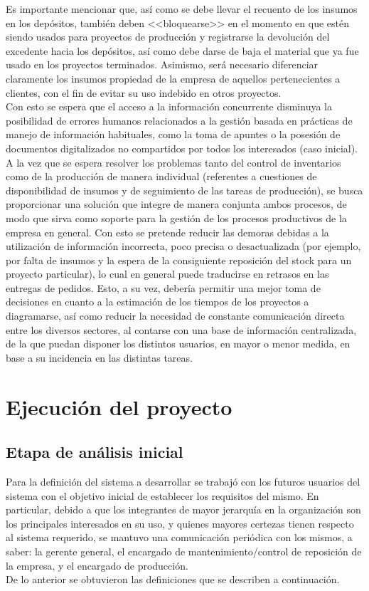 \documentclass[a4paper, 12pt,twoside]{report}  %
\numberwithin{equation}{subsection} %
\begin{document}
\indent Es importante mencionar que, así como se debe llevar el recuento de los insumos en los depósitos, también deben <<bloquearse>> en el momento en que estén siendo usados para proyectos de producción y registrarse la devolución del excedente hacia los depósitos, así como debe darse de baja el material que ya fue usado en los proyectos terminados. Asimismo, será necesario diferenciar claramente los insumos propiedad de la empresa de aquellos pertenecientes a clientes, con el fin de evitar su uso indebido en otros proyectos.\\
\indent Con esto se espera que el acceso a la información concurrente disminuya la posibilidad de errores humanos relacionados a la gestión basada en prácticas de manejo de información habituales, como la toma de apuntes o la posesión de documentos digitalizados no compartidos por todos los interesados (caso inicial). A la vez que se espera resolver los problemas tanto del control de inventarios como de la producción de manera individual (referentes a cuestiones de disponibilidad de insumos y de seguimiento de las tareas de producción), se busca proporcionar una solución que integre de manera conjunta ambos procesos, de modo que sirva como soporte para la gestión de los procesos productivos de la empresa en general. Con esto se pretende reducir las demoras debidas a la utilización de información incorrecta, poco precisa o desactualizada (por ejemplo, por falta de insumos y la espera de la consiguiente reposición del stock para un proyecto particular), lo cual en general puede traducirse en retrasos en las entregas de pedidos. Esto, a su vez, debería permitir una mejor toma de decisiones en cuanto a la estimación de los tiempos de los proyectos a diagramarse, así como reducir la necesidad de constante comunicación directa entre los diversos sectores, al contarse con una base de información centralizada, de la que puedan disponer los distintos usuarios, en mayor o menor medida, en base a su incidencia en las distintas tareas.

\chapter{Ejecución del proyecto}
\label{Ejecución del proyecto}

\section{Etapa de análisis inicial}
Para la definición del sistema a desarrollar se trabajó con los futuros usuarios del sistema con el objetivo inicial de establecer los requisitos del mismo. En particular, debido a que los integrantes de mayor jerarquía en la organización son los principales interesados en su uso, y quienes mayores certezas tienen respecto al sistema requerido, se mantuvo una comunicación periódica con los mismos, a saber: la gerente general, el encargado de mantenimiento/control de reposición de la empresa, y el encargado de producción.\\
\indent De lo anterior se obtuvieron las definiciones que se describen a continuación.
\end{document}
